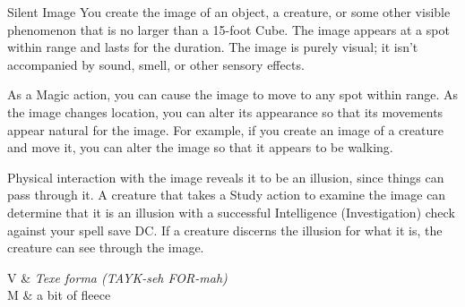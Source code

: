 \begin{Spell}[
  tags=Concentration,
  level={1st},
  time={1 action},
  range={60 ft/15 ft cube},
  components={V, S, M},
  duration={10 minutes},
  school={Illusion},
  attack={None},
  effect={Control}
]{Silent Image}
You create the image of an object, a creature, or some other visible phenomenon that is no larger than a 15-foot Cube. The image appears at a spot within range and lasts for the duration. The image is purely visual; it isn't accompanied by sound, smell, or other sensory effects.

As a Magic action, you can cause the image to move to any spot within range. As the image changes location, you can alter its appearance so that its movements appear natural for the image. For example, if you create an image of a creature and move it, you can alter the image so that it appears to be walking.

Physical interaction with the image reveals it to be an illusion, since things can pass through it. A creature that takes a Study action to examine the image can determine that it is an illusion with a successful Intelligence (Investigation) check against your spell save DC. If a creature discerns the illusion for what it is, the creature can see through the image.
\vfill%
\begin{components}
V & \textit{Texe forma (TAYK-seh FOR-mah)} \\
M & a bit of fleece
\end{components}
\end{Spell}


